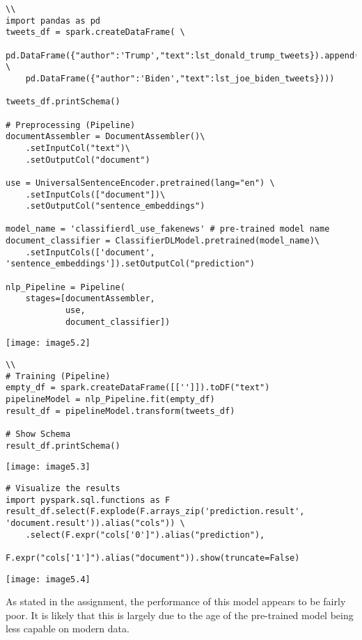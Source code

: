 \documentclass[]{article}
\begin{document}
\begin{verbatim}\\
import pandas as pd
tweets_df = spark.createDataFrame( \
	pd.DataFrame({"author":'Trump',"text":lst_donald_trump_tweets}).append( \
	pd.DataFrame({"author":'Biden',"text":lst_joe_biden_tweets})))

tweets_df.printSchema()

# Preprocessing (Pipeline)
documentAssembler = DocumentAssembler()\
	.setInputCol("text")\
	.setOutputCol("document")

use = UniversalSentenceEncoder.pretrained(lang="en") \
	.setInputCols(["document"])\
	.setOutputCol("sentence_embeddings")

model_name = 'classifierdl_use_fakenews' # pre-trained model name
document_classifier = ClassifierDLModel.pretrained(model_name)\
	.setInputCols(['document', 
'sentence_embeddings']).setOutputCol("prediction")

nlp_Pipeline = Pipeline(
	stages=[documentAssembler, 
			use,
			document_classifier])
\end{verbatim}
\texttt{[image: image5.2]} %

\begin{verbatim}\\
# Training (Pipeline)
empty_df = spark.createDataFrame([['']]).toDF("text")
pipelineModel = nlp_Pipeline.fit(empty_df)
result_df = pipelineModel.transform(tweets_df)

# Show Schema
result_df.printSchema()
\end{verbatim}
\texttt{[image: image5.3]} %


\begin{verbatim}
# Visualize the results
import pyspark.sql.functions as F
result_df.select(F.explode(F.arrays_zip('prediction.result', 
'document.result')).alias("cols")) \
	.select(F.expr("cols['0']").alias("prediction"),
			F.expr("cols['1']").alias("document")).show(truncate=False)
\end{verbatim}
\texttt{[image: image5.4]} %

As stated in the assignment, the performance of this model appears to be fairly poor. It is likely that this is largely due to the age of the pre-trained model being less capable on modern data.
\end{document}
